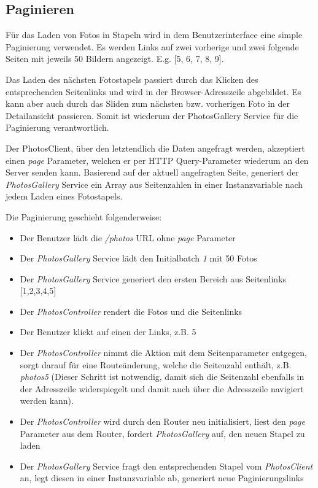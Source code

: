 \label{imp:pagination}
\subsection{Paginieren}

Für das Laden von Fotos in Stapeln wird in dem Benutzerinterface eine simple Paginierung verwendet. Es werden Links auf zwei vorherige und zwei folgende Seiten mit jeweils 50 Bildern angezeigt. E.g. [5, 6, 7, 8, 9].

Das Laden des nächsten Fotostapels passiert durch das Klicken des entsprechenden Seitenlinks und wird in der Browser-Adresszeile abgebildet. Es kann aber auch durch das Sliden zum nächsten bzw. vorherigen Foto in der Detailansicht passieren. Somit ist wiederum der PhotosGallery Service für die Paginierung verantwortlich.

Der PhotosClient, über den letztendlich die Daten angefragt werden, akzeptiert einen \textit{page} Parameter, welchen er per HTTP Query-Parameter wiederum an den Server senden kann. Basierend auf der aktuell angefragten Seite, generiert der \textit{PhotosGallery} Service ein Array aus Seitenzahlen in einer Instanzvariable nach jedem Laden eines Fotostapels.

Die Paginierung geschieht folgenderweise:

\begin{itemize}
  \item Der Benutzer lädt die \textit{/photos} URL ohne \textit{page} Parameter
  \item Der \textit{PhotosGallery} Service lädt den Initialbatch \textit{1} mit 50 Fotos
  \item Der \textit{PhotosGallery} Service generiert den ersten Bereich aus Seitenlinks [1,2,3,4,5]
  \item Der \textit{PhotosController} rendert die Fotos und die Seitenlinks
  \item Der Benutzer klickt auf einen der Links, z.B. 5
  \item Der \textit{PhotosController} nimmt die Aktion mit dem Seitenparameter entgegen, sorgt darauf für eine Routeänderung, welche die Seitenzahl enthält, z.B. \textit{\/photos\/5}
  (Dieser Schritt ist notwendig, damit sich die Seitenzahl ebenfalls in der Adresszeile widerspiegelt und damit auch über die Adresszeile navigiert werden kann).
  \item Der \textit{PhotosController} wird durch den Router neu initialisiert, liest den \textit{page} Parameter aus dem Router, fordert \textit{PhotosGallery} auf, den neuen Stapel zu laden
  \item Der \textit{PhotosGallery} Service fragt den entsprechenden Stapel vom \textit{PhotosClient} an, legt diesen in einer Instanzvariable ab, generiert neue Paginierungslinks
\end{itemize}

